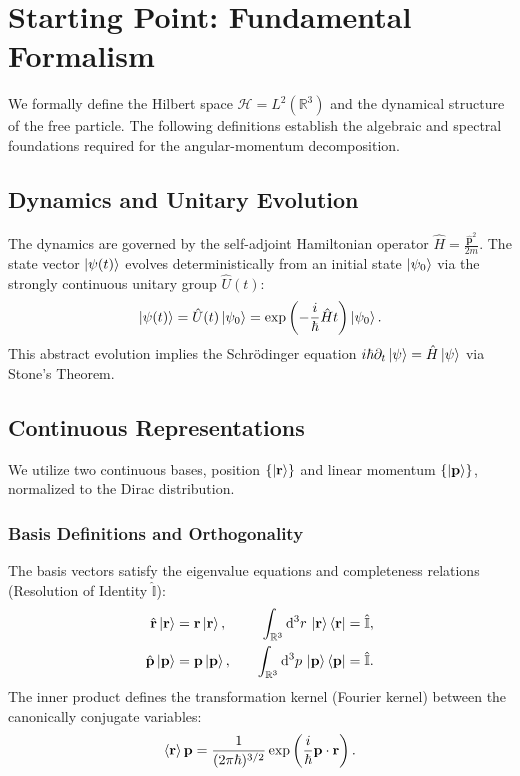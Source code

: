 \section{Starting Point: Fundamental Formalism}

We formally define the Hilbert space $\mathcal{H} = L^2(\mathbb{R}^3)$ and the
dynamical structure of the free particle. The following definitions establish
the algebraic and spectral foundations required for the angular-momentum
decomposition.

\subsection{Dynamics and Unitary Evolution}

The dynamics are governed by the self-adjoint Hamiltonian operator $\hat{H} =
\frac{\hat{\mathbf{p}}^2}{2m}$. The state vector $\ket{\psi(t)}$ evolves
deterministically from an initial state $\ket{\psi_0}$ via the strongly
continuous unitary group $\hat{U}(t)$:
\begin{equation}
  \ket{\psi(t)} = \hat{U}(t)\ket{\psi_0} =
  \exp\left(-\frac{i}{\hbar}\hat{H}t\right)\ket{\psi_0}.
\end{equation}
This abstract evolution implies the Schrödinger equation $i\hbar \partial_t
\ket{\psi} = \hat{H}\ket{\psi}$ via Stone's Theorem.

\subsection{Continuous Representations}

We utilize two continuous bases, position $\{\ket{\mathbf{r}}\}$ and linear
momentum $\{\ket{\mathbf{p}}\}$, normalized to the Dirac distribution.

\subsubsection{Basis Definitions and Orthogonality}
The basis vectors satisfy the eigenvalue equations and completeness relations
(Resolution of Identity $\hat{\mathbb{I}}$):
\begin{align}
  \hat{\mathbf{r}}\ket{\mathbf{r}} &= \mathbf{r}\ket{\mathbf{r}}, \quad &
  \int_{\mathbb{R}^3} \mathrm{d}^3r \, \ket{\mathbf{r}}\bra{\mathbf{r}} &=
  \hat{\mathbb{I}}, \\
  \hat{\mathbf{p}}\ket{\mathbf{p}} &= \mathbf{p}\ket{\mathbf{p}}, \quad &
  \int_{\mathbb{R}^3} \mathrm{d}^3p \, \ket{\mathbf{p}}\bra{\mathbf{p}} &=
  \hat{\mathbb{I}}.
\end{align}
The inner product defines the transformation kernel (Fourier kernel) between the
canonically conjugate variables:
\begin{equation}
  \braket{\mathbf{r}}{\mathbf{p}} = \frac{1}{(2\pi\hbar)^{3/2}} \exp\left(
  \frac{i}{\hbar} \mathbf{p}\cdot\mathbf{r} \right).
\end{equation}

